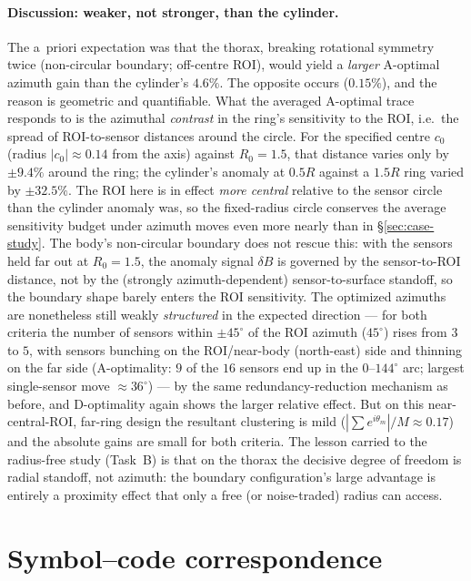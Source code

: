 \documentclass[11pt,a4paper]{article}
\begin{document}
\paragraph{Discussion: weaker, not stronger, than the cylinder.} The a~priori expectation was that
the thorax, breaking rotational symmetry twice (non-circular boundary; off-centre ROI), would
yield a \emph{larger} A-optimal azimuth gain than the cylinder's $4.6\%$. The opposite occurs
($0.15\%$), and the reason is geometric and quantifiable. What the averaged A-optimal trace
responds to is the azimuthal \emph{contrast} in the ring's sensitivity to the ROI, i.e.\ the spread
of ROI-to-sensor distances around the circle. For the specified centre $c_0$ (radius
$|c_0|\approx0.14$ from the axis) against $R_0=1.5$, that distance varies only by $\pm9.4\%$ around
the ring; the cylinder's anomaly at $0.5R$ against a $1.5R$ ring varied by $\pm32.5\%$. The ROI
here is in effect \emph{more central} relative to the sensor circle than the cylinder anomaly was,
so the fixed-radius circle conserves the average sensitivity budget under azimuth moves even more
nearly than in \S\ref{sec:case-study}. The body's non-circular boundary does not rescue this: with
the sensors held far out at $R_0=1.5$, the anomaly signal $\delta B$ is governed by the
sensor-to-ROI distance, not by the (strongly azimuth-dependent) sensor-to-surface standoff, so the
boundary shape barely enters the ROI sensitivity. The optimized azimuths are nonetheless still
weakly \emph{structured} in the expected direction --- for both criteria the number of sensors
within $\pm45^\circ$ of the ROI azimuth ($45^\circ$) rises from $3$ to $5$, with sensors bunching
on the ROI/near-body (north-east) side and thinning on the far side (A-optimality: $9$ of the $16$
sensors end up in the $0$--$144^\circ$ arc; largest single-sensor move $\approx36^\circ$) --- by
the same redundancy-reduction mechanism as before, and D-optimality again shows the larger
relative effect. But on this near-central-ROI, far-ring design the resultant clustering is mild
($|\!\sum e^{i\theta_m}|/M\approx0.17$) and the absolute gains are small for both criteria. The
lesson carried to the radius-free study (Task~B) is that on the thorax the decisive degree of
freedom is radial standoff, not azimuth: the boundary configuration's large advantage is entirely
a proximity effect that only a free (or noise-traded) radius can access.

\section*{Symbol--code correspondence}
\end{document}

